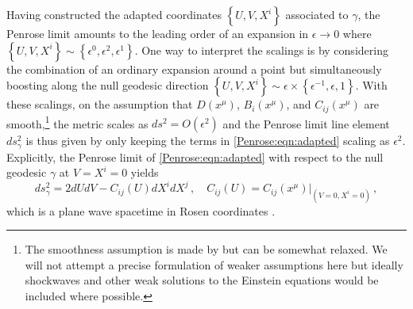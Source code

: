 Having constructed the adapted coordinates  $\left\lbrace U, V, X^i \right\rbrace$ associated to $\gamma$, the
Penrose limit amounts to the leading order of an expansion in $\epsilon \to 0$ where $\left\lbrace U, V, X^i
\right\rbrace \sim \left\lbrace \epsilon^0, \epsilon^2, \epsilon^1 \right\rbrace$. One way to interpret
the scalings is by considering the combination of an ordinary expansion around a point but simultaneously boosting
along the null geodesic direction $\left\lbrace U, V, X^i \right\rbrace \sim \epsilon \times \left\lbrace
\epsilon^{-1}, \epsilon, 1 \right\rbrace$. With these scalings, on the assumption that $D(x^{\mu})$,
$B_i(x^{\mu})$, and $C_{ij}(x^{\mu})$ are smooth,\footnote{The smoothness assumption is made by \cite{penrose1976any} but can be somewhat relaxed. We will not attempt a precise formulation of weaker assumptions here but ideally shockwaves and other weak solutions to the Einstein equations would be included where possible.} the metric scales as $ds^2 = O(\epsilon^2)$ and the Penrose limit line element $ds_{\gamma}^2$ is thus given by only keeping the terms in \eqref{Penrose:eqn:adapted} scaling as $\epsilon^2$. Explicitly, the Penrose limit of \eqref{Penrose:eqn:adapted} with respect to the null geodesic $\gamma$ at $V=X^i=0$ yields
\begin{equation}\label{Penrose:eqn:Rosen}
ds_{\gamma}^2 = 2 dU dV - C_{ij}\left(U\right)dX^i dX^j  \, , \quad C_{ij}\left(U\right) = C_{ij}\left(x^{\mu}\right)|_{(V=0, X^i=0)} \, ,
\end{equation}
which is a plane wave spacetime in Rosen coordinates \cite{rosen1937plane}.


